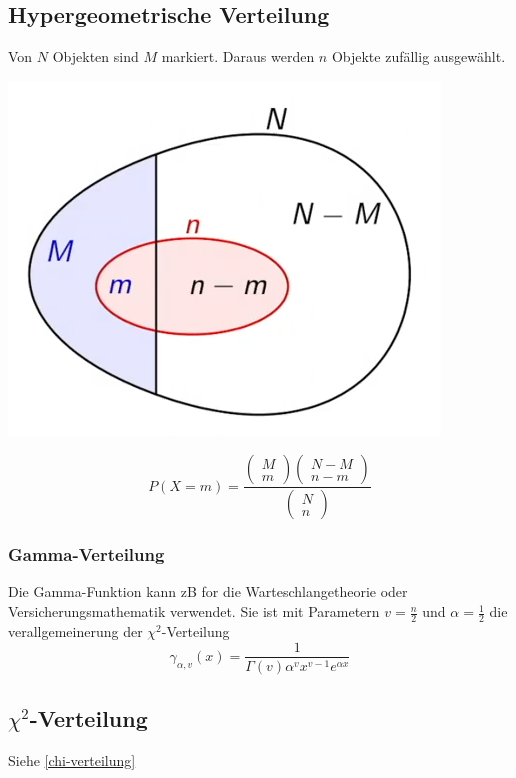 \subsection{Hypergeometrische Verteilung}
Von $N$ Objekten sind $M$ markiert. Daraus werden $n$ Objekte zufällig ausgewählt.

\begin{center}
	\begin{minipage}{0.20\textwidth}
		\begin{center}
			\includegraphics[width=\linewidth,keepaspectratio=true]{Images/hypergem-verteilung}\\
		\end{center}
	\end{minipage}%
	\begin{minipage}{0.3\textwidth}
	\[
	P(X=m) = \frac{\begin{pmatrix}	M \\ m\end{pmatrix}\begin{pmatrix}	N-M \\ n-m\end{pmatrix}}{\begin{pmatrix} N \\ n\end{pmatrix}}
	\]
	\end{minipage}
\end{center}


\subsubsection{Gamma-Verteilung}
Die Gamma-Funktion kann zB for die Warteschlangetheorie oder Versicherungsmathematik verwendet. Sie ist mit Parametern $v=\frac{n}{2}$ und $\alpha=\frac{1}{2}$ die verallgemeinerung der $\chi^2$-Verteilung 
\[
\gamma_{\alpha,v}(x) = \frac{1}{\Gamma(v)\alpha^vx^{v-1}e^{\alpha x}}
\]

\subsection{$\chi^2$-Verteilung}
Siehe \ref{chi-verteilung}